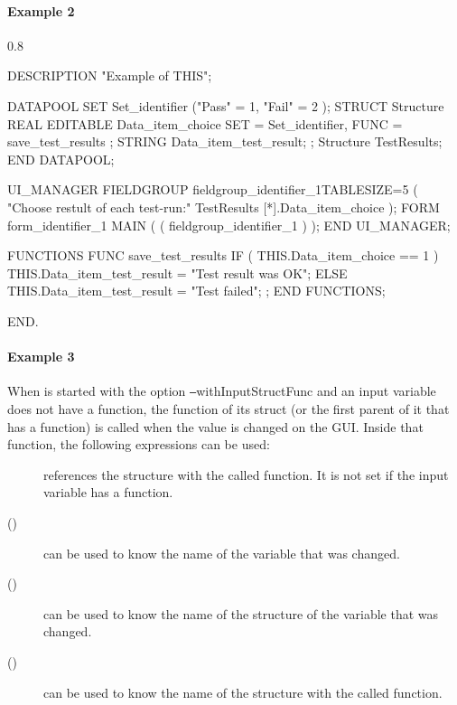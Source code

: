 \newpage
\paragraph*{Example 2}
\label{fuexample2}

\begin{boxedminipage}[t]{0.8\linewidth}
\begin{intens}
DESCRIPTION "Example of THIS";

DATAPOOL
  SET Set_identifier ("Pass" = 1, "Fail" = 2 );
  STRUCT Structure {
    REAL {EDITABLE}
      Data_item_choice { SET = Set_identifier,
                         FUNC = save_test_results };
    STRING
      Data_item_test_result;
  };
  Structure TestResults;
END DATAPOOL;

UI_MANAGER
  FIELDGROUP fieldgroup_identifier_1{TABLESIZE=5} (
    "Choose restult of each test-run:"
    TestResults [*].Data_item_choice
  );
  FORM form_identifier_1 {MAIN} (
    ( fieldgroup_identifier_1 )
  );
END UI_MANAGER;

FUNCTIONS
  FUNC save_test_results {
    IF ( THIS.Data_item_choice == 1 ) {
      THIS.Data_item_test_result = "Test result was OK";
    }
    ELSE {
      THIS.Data_item_test_result = "Test failed";
    }
  }
;
END FUNCTIONS;

END.
\end{intens}
\end{boxedminipage}

\newpage
\paragraph*{Example 3}
\label{fuexample3}

When \INTENS{} is started with the option \texttt{--}withInputStructFunc
and an input variable does not have a function, the function
of its struct (or the first parent of it that has a function)
is called when the value is changed on the GUI. Inside that
function, the following expressions can be used:

\begin{description}
\item[\BASE] references the structure with the called function.
It is not set if the input variable has a function.

\item[\NODE(\INPUT)] can be used to know the name of the variable that was changed.

\item[\NODE(\THIS)] can be used to know the name of the structure of the variable that was changed.

\item[\NODE(\BASE)] can be used to know the name of the structure with the called function.
\end{description}

